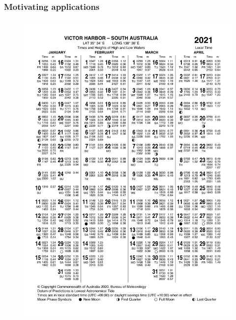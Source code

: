 \begin{frame}
\frametitle{Motivating applications}
\begin{minipage}{0.45\textwidth}
    \begin{figure}      
    \includegraphics[width=\textwidth]{figures/images/IDO59001_2021_SA_TP006.pdf}
    \end{figure}
\end{minipage}
\hfill
\begin{minipage}{0.45\textwidth}
    \begin{figure}      

\end{figure}
\end{minipage}
\end{frame}
